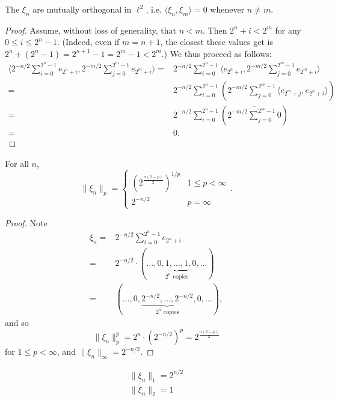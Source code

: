 \documentclass[12pt]{article}
\begin{document}
\begin{proposition}[]
	The $\xi_n$ are mutually orthogonal in $\ell^2$, i.e. $\langle \xi_n,\xi_m \rangle=0$ whenever $n\neq m$.
\end{proposition}
\begin{proof}
	Assume, without loss of generality, that $n<m$. Then $2^n+i<2^m$ for any $0\leq i \leq 2^n-1$. (Indeed, even if $m=n+1$, the closest these values get is $2^n+(2^n-1)=2^{n+1}-1=2^m-1<2^m$.) We thus proceed as follows: 
	\begin{align*}
		\langle 2^{-n/2}\sum_{i=0}^{2^n-1}e_{2^n+i}, 2^{-m/2}\sum_{j=0}^{2^m-1}e_{2^m+i} \rangle 
		=& 2^{-n/2}\sum_{i=0}^{2^n-1} \langle e_{2^n+i}, 2^{-m/2}\sum_{j=0}^{2^m-1}e_{2^m+i} \rangle \\
		=& 2^{-n/2}\sum_{i=0}^{2^n-1} \left( \overline{ 2^{-m/2}\sum_{j=0}^{2^m-1} \langle e_{2^m+j}, e_{2^n+i} \rangle } \right) \\
		=& 2^{-n/2}\sum_{i=0}^{2^n-1} \left( \overline{ 2^{-m/2}\sum_{j=0}^{2^m-1} 0 } \right) \\
		=& 0.
	\end{align*}
\end{proof}

\begin{proposition}[]
	For all $n$,
	\begin{equation*}
		\|\xi_n\|_p = 
		\begin{cases}
			\left( 2^{\frac{n(2-p)}{2}} \right)^{1/p} & 1\leq p < \infty \\
			2^{-n/2} & p=\infty
		\end{cases}.
	\end{equation*}
\end{proposition}

\begin{proof}
	Note 
	\begin{align*}
		\xi_n =& 2^{-n/2}\sum_{i=0}^{2^n-1}e_{2^n+i} \\
		=& 2^{-n/2}\cdot (\dots, 0, \underbrace{1,\dots,1}_{2^n\text{ copies}}, 0,\dots) \\
		=& (\dots, 0, \underbrace{2^{-n/2},\dots,2^{-n/2}}_{2^n\text{ copies}}, 0,\dots),
	\end{align*}
	and so 
	\begin{equation*}
		\|\xi_n\|_p^p = 2^n\cdot (2^{-n/2})^p = 2^{\frac{n(2-p)}{2}}
	\end{equation*}
	for $1\leq p < \infty$, and $\|\xi_n\|_\infty=2^{-n/2}$.
\end{proof}

\begin{corollary}[]
	\begin{gather*}
		\|\xi_n\|_1 = 2^{n/2} \\
		\|\xi_n\|_2 = 1 \\
	\end{gather*}
\end{corollary}
\end{document}
